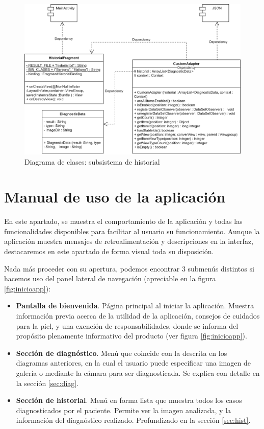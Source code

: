       \begin{figure}[H]
 	\centering
 	\includegraphics[scale = 0.75]{imagenes/androidAPP-Historial.png}
 	\caption{Diagrama de clases: subsistema de historial}
 	\label{fig:claseshist}
 \end{figure}
 
 \section{Manual de uso de la aplicación}
 En este apartado, se muestra el comportamiento de la aplicación y todas las funcionalidades disponibles para facilitar al usuario su funcionamiento.  Aunque la aplicación muestra mensajes de retroalimentación y descripciones en la interfaz, destacaremos en este apartado de forma visual toda su disposición.
 
 Nada más proceder con su apertura, podemos encontrar 3 submenús distintos si hacemos uso del panel lateral de navegación (apreciable en la figura  \ref{fig:inicioapp}):
 \begin{itemize}
 	\item  \textbf{Pantalla de bienvenida}. Página principal al iniciar la aplicación. Muestra información previa acerca de la utilidad de la aplicación, consejos de cuidados para la piel, y una exención de responsabilidades, donde se informa del propósito plenamente informativo del producto (ver figura \ref{fig:inicioapp}).
 	\item \textbf{Sección de diagnóstico}. Menú que coincide con la descrita en los diagramas anteriores, en la cual el usuario puede especificar una imagen de galería o mediante la cámara para ser diagnosticada. Se explica con detalle en la sección \ref{sec:diag}.
 	\item \textbf{Sección de historial}. Menú en forma lista que muestra todos los casos diagnosticados por el paciente. Permite ver la imagen analizada, y la información del diagnóstico realizado. Profundizado en la sección \ref{sec:hist}.
 \end{itemize}
 

